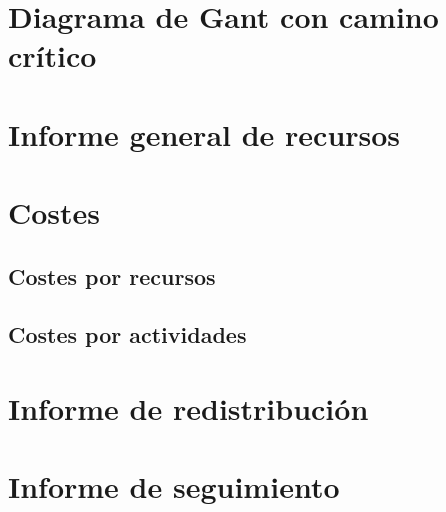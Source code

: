 \documentclass[11pt,a4paper,spanish,twoside]{book}
\begin{document}
\section{Diagrama de Gant con camino crítico}

\section{Informe general de recursos}

\section{Costes}
\subsection{Costes por recursos}
\subsection{Costes por actividades}

\section{Informe de redistribución}

\section{Informe de seguimiento}


 

\end{document}
